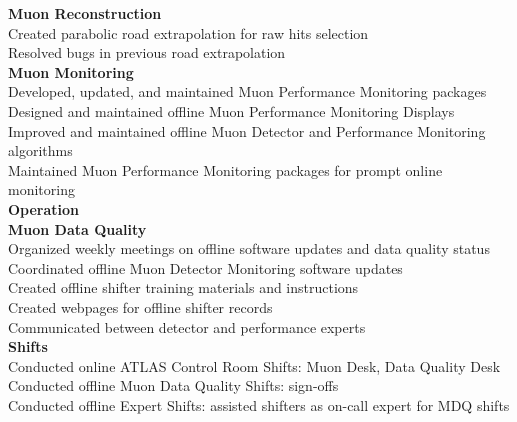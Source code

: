 \documentclass[letterpaper,11pt,oneside]{article}
\begin{document}
 	\quad \textbf{Muon Reconstruction}\\
	\quad \quad Created parabolic road extrapolation for raw hits selection \\
	\quad \quad Resolved bugs in previous road extrapolation \\
	\vspace{0.1cm}
 	\quad \textbf{Muon Monitoring}\\
	\quad \quad Developed, updated, and maintained Muon Performance Monitoring packages\\
	\quad \quad Designed and maintained offline Muon Performance Monitoring Displays \\
	\quad \quad Improved and maintained offline Muon Detector and Performance Monitoring algorithms\\
	\quad \quad Maintained Muon Performance Monitoring packages for prompt online monitoring \\
	\vspace{0.4cm}
 \textbf{Operation}\\
	\vspace{0.1cm}
 	\quad \textbf{Muon Data Quality}\\
	\quad \quad Organized weekly meetings on offline software updates and data quality status \\
	\quad \quad Coordinated offline Muon Detector Monitoring software updates\\
	\quad \quad Created offline shifter training materials and instructions  \\
	\quad \quad Created webpages for offline shifter records  \\
	\quad \quad Communicated between detector and performance experts  \\
	\vspace{0.1cm}
 	\quad \textbf{Shifts}\\
	\quad \quad Conducted online ATLAS Control Room Shifts: Muon Desk,  Data Quality Desk \\
	\quad \quad Conducted offline Muon Data Quality Shifts: sign-offs \\
	\quad \quad Conducted offline Expert Shifts: assisted shifters as on-call expert for MDQ shifts \\
\end{document}
